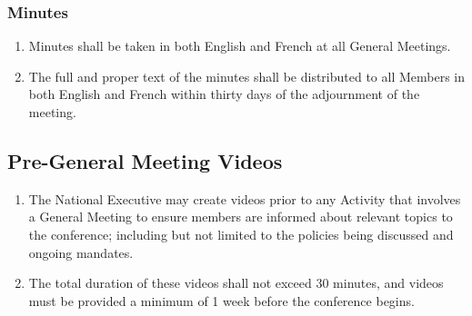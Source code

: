 \subsubsection{Minutes}
\label{meeting-guidelines-minutes}

\begin{enumerate}
 \item Minutes shall be taken in both English and French at all General Meetings.
 \item The full and proper text of the minutes shall be distributed to all Members in both English and French within thirty days of the adjournment of the meeting.
\end{enumerate}

\subsection{Pre-General Meeting Videos}
\label{general-meetings-pre-general-meeting-videos}

\begin{enumerate}
 \item The National Executive may create videos prior to any Activity that involves a General Meeting to ensure members are informed about relevant topics to the conference; including but not limited to the policies being discussed and ongoing mandates.
 \item The total duration of these videos shall not exceed 30 minutes, and videos must be provided a minimum of 1 week before the conference begins.
\end{enumerate}
